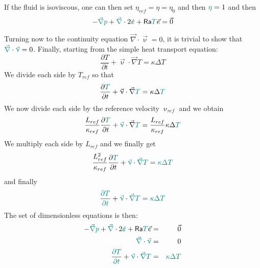 If the fluid is isoviscous, one can then set $\eta_{ref}=\eta=\eta_0$ and then ${\color{teal}\eta}=1$ and then 
\[
-{\color{teal} \vec\nabla} {\color{teal}p} + {\color{teal} \vec\nabla} \cdot 2  {\color{teal} \dot{\bm\varepsilon}}
+ {\mathsf{Ra}} {\color{teal} T} \vec{e}= \vec{0}
\]

Turning now to the continuity equation $\vec\nabla \cdot\vec\upnu = 0$,
it is trivial to show that  ${\color{teal} \vec\nabla } \cdot  {\color{teal}\vec\upnu} = 0$.
Finally, starting from the simple heat transport equation:
\[
\frac{\partial T}{\partial t} + \vec\upnu\cdot\vec\nabla T = \kappa \Delta T
\]
We divide each side by $T_{ref}$ so that 
\[
\frac{\partial {\color{teal}T}}{\partial t} + \vec\upnu\cdot\vec\nabla {\color{teal}T} = \kappa \Delta {\color{teal}T}
\]
We now divide each side by the reference velocity $\upnu_{ref}$ 
and we obtain
\[
\frac{L_{ref}}{\kappa_{ref}} \frac{\partial {\color{teal}T}}{\partial t} + {\color{teal} \vec\upnu} \cdot\vec\nabla {\color{teal}T} 
=  \frac{L_{ref}}{\kappa_{ref}}  \kappa \Delta {\color{teal}T}
\]
We multiply each side by $L_{ref}$ and we finally get
\[
\frac{L_{ref}^2}{\kappa_{ref}} 
\frac{\partial {\color{teal}T}}{\partial t}
+ {\color{teal} \vec\upnu} \cdot  {\color{teal}\vec\nabla} {\color{teal}T} =  {\color{teal} \kappa} {\color{teal}\Delta} {\color{teal}T}
\]
and finally
\[
\frac{ {\color{teal} \partial T}}{ {\color{teal} \partial t}} 
+ {\color{teal} \vec\upnu} \cdot  {\color{teal}\vec\nabla} {\color{teal}T} =  {\color{teal} \kappa} {\color{teal}\Delta} {\color{teal}T}
\]
The set of dimensionless equations is then:
\begin{eqnarray}
-{\color{teal} \vec\nabla} {\color{teal}p} + {\color{teal} \vec\nabla} \cdot 2  {\color{teal} \dot{\bm\varepsilon}}
+ {\mathsf{Ra}}  {\color{teal} T} \vec{e} &=& \vec{0} \\
{\color{teal} \vec\nabla } \cdot  {\color{teal}\vec\upnu} &=& 0 \\
\frac{ {\color{teal} \partial T}}{ {\color{teal} \partial t}} 
+ {\color{teal} \vec\upnu} \cdot  {\color{teal}\vec\nabla} {\color{teal}T} &=&  {\color{teal} \kappa} {\color{teal}\Delta} {\color{teal}T}
\end{eqnarray}



